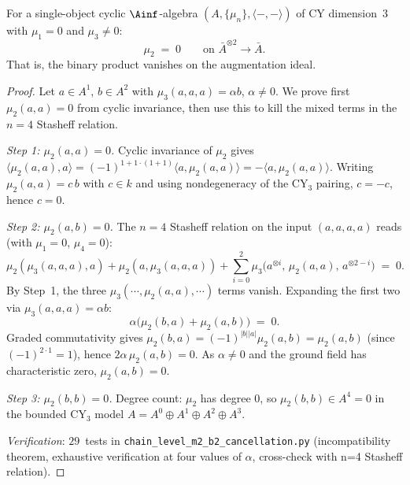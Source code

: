 \begin{theorem}
\label{thm:single-object-incompatibility}
\ClaimStatusProvedHere{}
For a single-object cyclic $\Ainf$-algebra
$(A, \{\mu_n\}, \langle -,- \rangle)$ of CY dimension~$3$ with
$\mu_1 = 0$ and $\mu_3 \neq 0$:
\[
 \mu_2 \;=\; 0 \qquad \text{on } \bar A^{\otimes 2} \to \bar A.
\]
That is, the binary product vanishes on the augmentation ideal.
\end{theorem}

\begin{proof}
Let $a \in A^1$, $b \in A^2$ with $\mu_3(a, a, a) = \alpha b$,
$\alpha \neq 0$.  We prove first $\mu_2(a, a) = 0$ from cyclic
invariance, then use this to kill the mixed terms in the $n = 4$
Stasheff relation.

\smallskip\noindent\emph{Step 1: $\mu_2(a, a) = 0$.}
Cyclic invariance of $\mu_2$ gives
$\langle \mu_2(a, a), a \rangle
= (-1)^{1 + 1 \cdot (1 + 1)}\langle a, \mu_2(a, a) \rangle
= -\langle a, \mu_2(a, a) \rangle$.  Writing
$\mu_2(a, a) = c\,b$ with $c \in k$ and using nondegeneracy
of the CY$_3$ pairing, $c = -c$, hence $c = 0$.

\smallskip\noindent\emph{Step 2: $\mu_2(a, b) = 0$.}
The $n = 4$ Stasheff relation on the input $(a, a, a, a)$ reads
(with $\mu_1 = 0$, $\mu_4 = 0$):
\[
 \mu_2(\mu_3(a,a,a), a) + \mu_2(a, \mu_3(a,a,a))
 + \sum_{i = 0}^{2}\mu_3\bigl(a^{\otimes i},\, \mu_2(a, a),\, a^{\otimes 2-i}\bigr)
 \;=\; 0.
\]
By Step~1, the three $\mu_3(\cdots, \mu_2(a, a), \cdots)$ terms
vanish.  Expanding the first two via $\mu_3(a, a, a) = \alpha b$:
\[
 \alpha\bigl(\mu_2(b, a) + \mu_2(a, b)\bigr) \;=\; 0.
\]
Graded commutativity gives $\mu_2(b, a)
= (-1)^{|b||a|}\mu_2(a, b) = \mu_2(a, b)$ (since
$(-1)^{2 \cdot 1} = 1$), hence
$2\alpha\,\mu_2(a, b) = 0$.  As $\alpha \neq 0$ and the
ground field has characteristic zero, $\mu_2(a, b) = 0$.

\smallskip\noindent\emph{Step 3: $\mu_2(b, b) = 0$.}
Degree count: $\mu_2$ has degree $0$, so
$\mu_2(b, b) \in A^{4} = 0$ in the bounded CY$_3$ model
$A = A^0 \oplus A^1 \oplus A^2 \oplus A^3$.

\noindent\textit{Verification}:
$29$~tests in \texttt{chain\_level\_m2\_b2\_cancellation.py}
(incompatibility theorem, exhaustive verification at four
values of $\alpha$, cross-check with n=4 Stasheff relation).
\end{proof}

